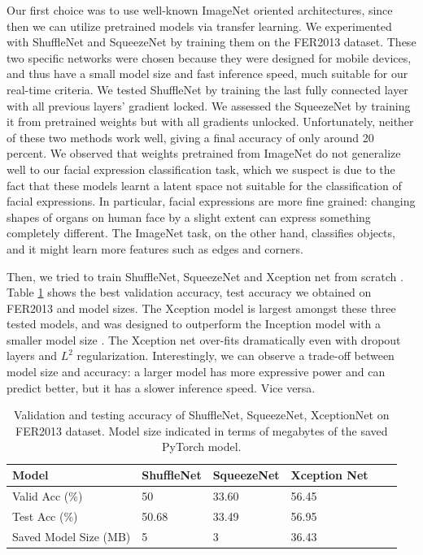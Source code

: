 \documentclass{article}
\begin{document}
Our first choice was to use well-known ImageNet oriented architectures, since then we can utilize pretrained models via transfer learning. We experimented with ShuffleNet and SqueezeNet \cite{shufflenet, squeezenet} by training them on the FER2013 dataset. These two specific networks were chosen because they were designed for mobile devices, and thus have a small model size and fast inference speed, much suitable for our real-time criteria. We tested ShuffleNet by training the last fully connected layer with all previous layers' gradient locked. We assessed the SqueezeNet by training it from pretrained weights but with all gradients unlocked. Unfortunately, neither of these two methods work well, giving a final accuracy of only around 20 percent. We observed that weights pretrained from ImageNet do not generalize well to our facial expression classification task, which we suspect is due to the fact that these models learnt a latent space not suitable for the classification of facial expressions. In particular, facial expressions are more fine grained: changing shapes of organs on human face by a slight extent can express something completely different. The ImageNet task, on the other hand, classifies objects, and it might learn more features such as edges and corners. 

Then, we tried to train ShuffleNet, SqueezeNet and Xception net from scratch \cite{xception}. Table \ref{tab:ioa comparisons} shows the best validation accuracy, test accuracy we obtained on FER2013 and model sizes. The Xception model is largest amongst these three tested models, and was designed to outperform the Inception model with a smaller model size \cite{inception, pandit_2020}. The Xception net over-fits dramatically even with dropout layers and $L^2$ regularization. Interestingly, we can observe a trade-off between model size and accuracy: a larger model has more expressive power and can predict better, but it has a slower inference speed. Vice versa.
\begin{table}[]
    \centering
    \begin{tabular}{@{}l|lllll@{}}
        \toprule
        Model                 & ShuffleNet & SqueezeNet  &   Xception Net\\ \midrule
        Valid Acc (\%)        & 50         & 33.60 & 56.45 \\
        Test Acc (\%)         & 50.68         & 33.49 &  56.95\\
        Saved Model Size (MB) & 5          & 3  &   36.43\\ 
        \bottomrule
    \end{tabular}
    \vspace{1em}
    \caption{Validation and testing accuracy of ShuffleNet, SqueezeNet, XceptionNet on FER2013 dataset. Model size indicated in terms of megabytes of the saved PyTorch model. }
    \label{tab:ioa comparisons}
\end{table}
\end{document}
